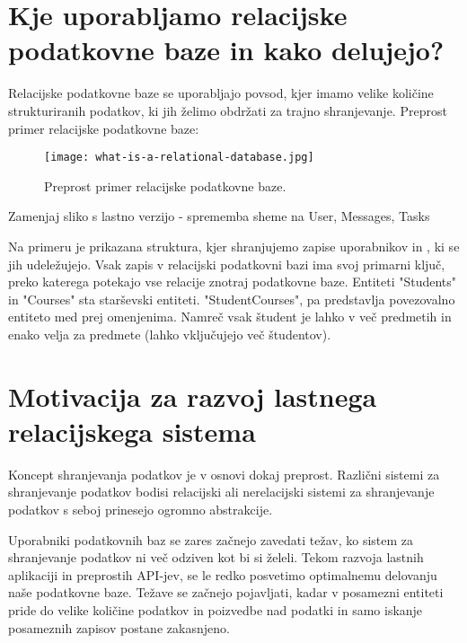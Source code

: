 \documentclass[a4paper,12pt,openright]{book}
\begin{document}
    \section{Kje uporabljamo relacijske podatkovne baze in kako delujejo?}

    Relacijske podatkovne baze se uporabljajo povsod, kjer imamo velike količine strukturiranih podatkov, ki jih želimo obdržati za trajno shranjevanje. Preprost primer relacijske podatkovne baze:
    
    \begin{figure}[h]
        \centerline{\texttt{[image: what-is-a-relational-database.jpg]}}
        \caption{Preprost primer relacijske podatkovne baze.}
        \label{sl:mindmap}
    \end{figure}

    \colorbox{BurntOrange}{Zamenjaj sliko s lastno verzijo - sprememba sheme na User, Messages, Tasks}

    Na primeru je prikazana struktura, kjer shranjujemo zapise uporabnikov in , ki se jih udeležujejo. Vsak zapis v relacijski podatkovni bazi ima svoj primarni ključ, preko katerega potekajo vse relacije znotraj podatkovne baze. Entiteti "Students" in "Courses" sta starševski entiteti. "StudentCourses", pa predstavlja povezovalno entiteto med prej omenjenima. Namreč vsak študent je lahko v več predmetih in enako velja za predmete (lahko vključujejo več študentov).

    \section{Motivacija za razvoj lastnega relacijskega sistema}
    Koncept shranjevanja podatkov je v osnovi dokaj preprost. Različni sistemi za shranjevanje podatkov bodisi relacijski ali nerelacijski sistemi za shranjevanje podatkov s seboj prinesejo ogromno abstrakcije.

    Uporabniki podatkovnih baz se zares začnejo zavedati težav, ko sistem za shranjevanje podatkov ni več odziven kot bi si želeli. Tekom razvoja lastnih aplikaciji in preprostih API-jev, se le redko posvetimo optimalnemu delovanju naše podatkovne baze. Težave se začnejo pojavljati, kadar v posamezni entiteti pride do velike količine podatkov in poizvedbe nad podatki in samo iskanje posameznih zapisov postane zakasnjeno.
\end{document}
